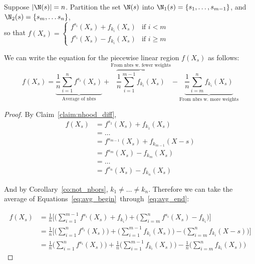 \begin{theorem}\label{thm:1layer_avg}
Suppose $|\N(s)| = n$. Partition the set $\N(s)$ into $\N_1(s) = \{ s_1, \ldots, s_{m-1} \}$, and $\N_2(s) = \{s_m, \ldots s_n\}$, \\so that $f(X_{s}) = \begin{cases}f^{s_i}(X_s) + f_{k_i}(X_s) & \text{if } i < m \\f^{s_i}(X_s) - f_{k_i}(X_s) & \text{if } i \geq m \end{cases}$ 

We can write the equation for the piecewise linear region $f(X_s)$ as follows:
\begin{equation}\label{eq:thm_1layer_avg}
f(X_s) = \underbrace{\frac{1}{n} \sum_{i=1}^n f^{s_i}(X_s)}_{\text{Average of nbrs}} + 
         \overbrace{\frac{1}{n} \sum_{i=1}^{m-1} f_{k_i}(X_s)}^{\text{From nbrs w. fewer weights}} - 
         \underbrace{\frac{1}{n} \sum_{i=m}^{n} f_{k_i}(X_s)}_{\text{From nbrs w. more weights}}
\end{equation}
\end{theorem}
\begin{proof}
By Claim~\ref{claim:nhood_diff}, 
\begin{align}
f(X_s) &= f^{s_1}(X_s) + f_{k_1}(X_s)\label{eq:avg_begin}\\
       &= \ldots\\
       &= f^{s_{m-1}}(X_s) + f_{k_{m-1}}(X-s)\\
       &= f^{s_m}(X_s) - f_{k_m}(X_s)\\
       &= \ldots\\
       &= f^{s_n}(X_s) - f_{k_n}(X_s)\label{eq:avg_end}
\end{align}

And by Corollary~\ref{co:not_nbors}, $k_1 \neq \ldots \neq k_n$. Therefore we can take the average of Equations~\ref{eq:avg_begin}~through~\ref{eq:avg_end}:

\begin{align*}
    f(X_s) &= \frac{1}{n} \bigg[ \big( \sum_{i=1}^{m-1}f^{s_i}(X_s) + f_{k_i}\big) +
              \big( \sum_{i=m}^{n} f^{s_i}(X_s) - f_{k_i} \big) \bigg]\\
           &= \frac{1}{n} \bigg[ \big(\sum_{i=1}^{n} f^{s_i}(X_s) \big) + 
              \big(\sum_{i=1}^{m-1} f_{k_i}(X_s) \big) -
              \big(\sum_{i=m}^{n} f_{k_i}(X-s) \big) \bigg] \\
           &= \frac{1}{n} \big(\sum_{i=1}^{n} f^{s_i}(X_s) \big) + 
              \frac{1}{n} \big(\sum_{i=1}^{m-1} f_{k_i}(X_s) \big) -
              \frac{1}{n} \big(\sum_{i=m}^{n} f_{k_i}(X_s) \big)
\end{align*}
\end{proof}


